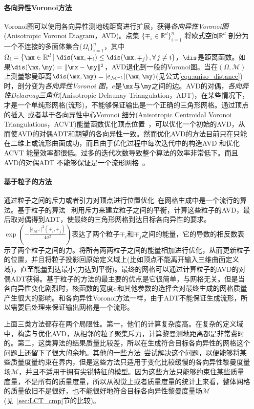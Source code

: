 \paragraph{各向异性Voronoi方法}
Voronoi图可以使用各向异性测地线距离进行扩展，获得\emph{各向异性Voronoi图}(Anisotropic Voronoi Diagram，AVD)。点集 $\{\mp_i \in \mathbb{R}^d \}_{i=1}^n$ 将欧式空间$\mathbb{R}^d$ 剖分为一个不连接的多面体集合$\{\Omega_i\}_{i=1}^n$，其中$\Omega_i = \{\mx \in \mathbb{R}^d \: | \: \dis(\mx, \mp_i) \leq \dis(\mx, \mp_j) \, , \forall \, j \neq i\}$，$\dis$是距离函数。如果$\dis(\mx, \my) = \|\mx-\my\|^2$，AVD退化到一般的Voronoi图。当在$(\Omega, \mathcal{M})$上测量黎曼距离$\dis(\mx, \my) = |e_{\mathcal{M}^{-1}}|(\mx, \my)$(见公式\ref{equ:aniso_distance})时，剖分变为\emph{各向异性Voronoi 图}，$e$是$\mx$与$\my$之间的边。AVD的对偶，\emph{各向异性Delaunay三角化}(Anisotropic Delaunay Triangulation，ADT)，在某些情况下，才是一个单纯形网格(流形)，不能够保证输出是一个正确的三角形网格。通过顶点的插入~\cite{Labelle2003,Cheng2006}或者基于各向异性中心Voronoi 细分(Anisotropic Centroidal Voronoi Triangulations，ACVT)能量函数优化顶点位置~\cite{Du2005,Valette2008,Levy2010,Levy2012}，可以优化一个初始的AVD，从而使AVD的对偶ADT和期望的各向异性一致。然而优化AVD的方法目前只在只能在二维上或流形曲面成功，而且由于优化过程中每次迭代中的构造AVD 和优化ACVT 能量效率都很低。过多的迭代次数导致整个算法的效率非常低下。而且AVD的对偶ADT 不能够保证是一个流形网格~\cite{Canas2011}。

\paragraph{基于粒子的方法}
通过粒子之间的斥力或者引力对顶点进行位置优化~\cite{Shimada2000,Persson2004}在网格生成中是一个流行的算法。基于粒子的算法~\cite{Shimada2000,Zhong2013} 利用斥力来建立粒子之间的平衡，计算这些粒子的AVD，最后取对偶得到ADT，使最终的三角形网格到达目标各向异性的要求。$\exp\left(-\frac{|e_{\mathcal{M}^{-1}}|^2(\mp_i,\mp_j)}{4\sigma^2}\right)$表达了两个粒子$\mp_i$和$\mp_j$之间的能量\cite{Zhong2013}，它的导数的相反数表示了两个粒子之间的力。将所有两两粒子之间的能量相加进行优化，从而更新粒子的位置，并且将粒子投影回原始定义域上(比如顶点不能离开输入三维曲面定义域)，直至能量到达最小(力达到平衡)。最终的网格可以通过计算粒子的AVD的对偶ADT获得。基于粒子的方法的最主要的优点是它很简单，与网格无关。但是当各向异性变化剧烈时，核函数的宽度$\sigma$和其他参数的选择会对最终生成的网格质量产生很大的影响。和各向异性Voronoi方法一样，由于ADT不能保证生成流形，所以需要后处理来保证输出网格是一个流形。

上面三类方法都存在两个局限性。第一，他们的计算复杂度高。在复杂的定义域中，构造与优化AVD，从相邻的粒子聚集斥力，计算黎曼测地距离都是非常费时的。第二，这类算法的结果质量比较差，所以在生成符合目标各向异性的网格这个问题上还留下了很大的余地。其他的一些方法~\cite{Labelle2003,Boissonnat2008,Boissonnat2013}尝试解决这个问题，以便能够将某些质量度量约束在界内，但是这些方法只适用于变化比较缓慢的各向异性黎曼度量场$\mathcal{M}$，并且不适用于拥有尖锐特征的模型。因为这些方法只能够约束住某些质量度量，不是所有的质量度量，所以从视觉上或者质量度量的统计上来看，整体网格的质量依旧不是很好，也不能很好地符合目标各向异性黎曼度量场$\mathcal{M}$(见~\ref{sec:LCT_cmp}节的比较)。


